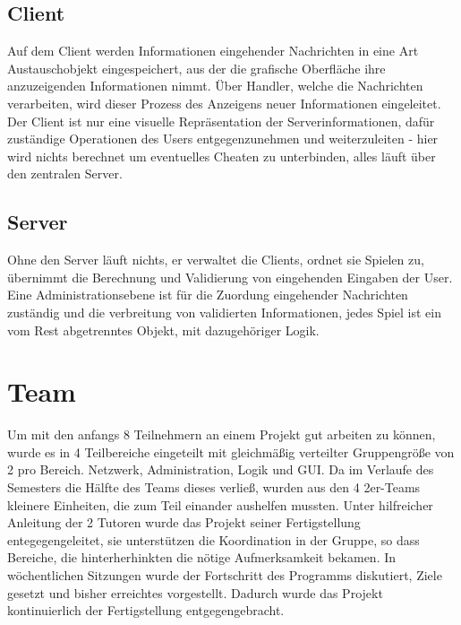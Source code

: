 \documentclass[a0, portrait, english, ngerman]{a0poster}
\begin{document}
\begin{multicols}{3}
\subsection{Client}

Auf dem Client werden Informationen eingehender Nachrichten in eine Art Austauschobjekt eingespeichert, aus der die grafische Oberfläche ihre anzuzeigenden Informationen nimmt. Über Handler, welche die Nachrichten verarbeiten, wird dieser Prozess des Anzeigens neuer Informationen eingeleitet. Der Client ist nur eine visuelle Repräsentation der Serverinformationen, dafür zuständige Operationen des Users entgegenzunehmen und weiterzuleiten - hier wird nichts berechnet um eventuelles Cheaten zu unterbinden, alles läuft über den zentralen Server.\\

\subsection{Server}

Ohne den Server läuft nichts, er verwaltet die Clients, ordnet sie Spielen zu, übernimmt die Berechnung und Validierung von eingehenden Eingaben der User. Eine Administrationsebene ist für die Zuordung eingehender Nachrichten zuständig und die verbreitung von validierten Informationen, jedes Spiel ist ein vom Rest abgetrenntes Objekt, mit dazugehöriger Logik.\\

\section{Team}

Um mit den anfangs 8 Teilnehmern an einem Projekt gut arbeiten zu können, wurde es in 4 Teilbereiche eingeteilt mit gleichmäßig verteilter Gruppengröße von 2 pro Bereich. Netzwerk, Administration, Logik und GUI. Da im Verlaufe des Semesters die Hälfte des Teams dieses verließ, wurden aus den 4 2er-Teams kleinere Einheiten, die zum Teil einander aushelfen mussten. Unter hilfreicher Anleitung der 2 Tutoren wurde das Projekt seiner Fertigstellung entegegengeleitet, sie unterstützen die Koordination in der Gruppe, so dass Bereiche, die hinterherhinkten die nötige Aufmerksamkeit bekamen. In wöchentlichen Sitzungen wurde der Fortschritt des Programms diskutiert, Ziele gesetzt und bisher erreichtes vorgestellt. Dadurch wurde das Projekt kontinuierlich der Fertigstellung entgegengebracht.\\


\end{multicols}
\end{document}
